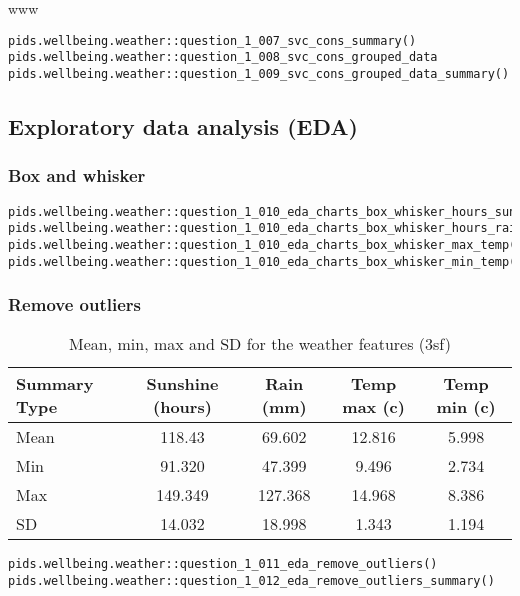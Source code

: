 www\documentclass[12pt, oneside, openany]{book}
\begin{document}
\begin{verbatim}
pids.wellbeing.weather::question_1_007_svc_cons_summary()
pids.wellbeing.weather::question_1_008_svc_cons_grouped_data
pids.wellbeing.weather::question_1_009_svc_cons_grouped_data_summary()
\end{verbatim}

\subsection*{Exploratory data analysis (EDA)}

\subsubsection*{Box and whisker}

\begin{verbatim}
pids.wellbeing.weather::question_1_010_eda_charts_box_whisker_hours_sun()
pids.wellbeing.weather::question_1_010_eda_charts_box_whisker_hours_rain()
pids.wellbeing.weather::question_1_010_eda_charts_box_whisker_max_temp()
pids.wellbeing.weather::question_1_010_eda_charts_box_whisker_min_temp()
\end{verbatim}

\subsubsection*{Remove outliers}

\begin{table}[h!]
	\centering
	\begin{tabular}{ |l|c|c|c|c| }
		\hline
		Summary Type & Sunshine (hours) & Rain (mm) & Temp max (c) & Temp min (c)\\
		\hline
		\hline
		Mean & 118.43  & 69.602  & 12.816 & 5.998 \\
		Min & 91.320  & 47.399  & 9.496   & 2.734 \\
		Max & 149.349 & 127.368  & 14.968  & 8.386 \\
		SD & 14.032  & 18.998   & 1.343  & 1.194 \\
		\hline
	\end{tabular}
	\caption{Mean, min, max and SD for the weather features (3sf)}
	\label{table:question_1_008_grouped_data_summary_non_scaled}
\end{table}

\begin{verbatim}
pids.wellbeing.weather::question_1_011_eda_remove_outliers()
pids.wellbeing.weather::question_1_012_eda_remove_outliers_summary()
\end{verbatim}
\end{document}
